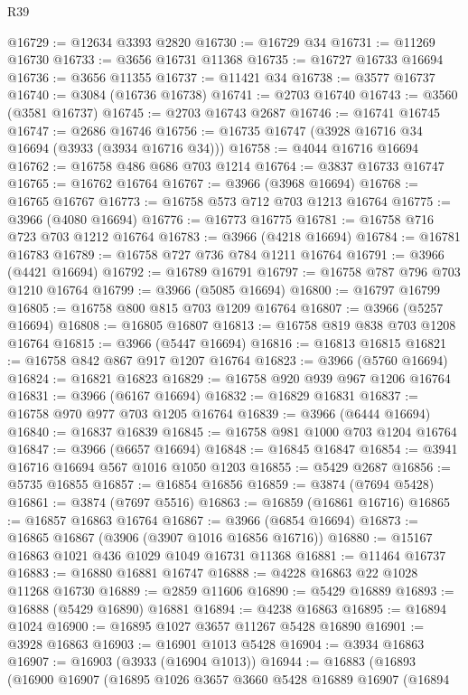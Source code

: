 \begin{lexlean}{R39}
\begin{coremodule}
@16729 := @12634 @3393 @2820
@16730 := @16729 @34
@16731 := @11269 @16730
@16733 := @3656 @16731 @11368
@16735 := @16727 @16733 @16694
@16736 := @3656 @11355
@16737 := @11421 @34
@16738 := @3577 @16737
@16740 := @3084 (@16736 @16738)
@16741 := @2703 @16740
@16743 := @3560 (@3581 @16737)
@16745 := @2703 @16743 @2687
@16746 := @16741 @16745
@16747 := @2686 @16746
@16756 := @16735 @16747 (@3928 @16716 @34 @16694 (@3933 (@3934 @16716 @34)))
@16758 := @4044 @16716 @16694
@16762 := @16758 @486 @686 @703 @1214
@16764 := @3837 @16733 @16747
@16765 := @16762 @16764
@16767 := @3966 (@3968 @16694)
@16768 := @16765 @16767
@16773 := @16758 @573 @712 @703 @1213 @16764
@16775 := @3966 (@4080 @16694)
@16776 := @16773 @16775
@16781 := @16758 @716 @723 @703 @1212 @16764
@16783 := @3966 (@4218 @16694)
@16784 := @16781 @16783
@16789 := @16758 @727 @736 @784 @1211 @16764
@16791 := @3966 (@4421 @16694)
@16792 := @16789 @16791
@16797 := @16758 @787 @796 @703 @1210 @16764
@16799 := @3966 (@5085 @16694)
@16800 := @16797 @16799
@16805 := @16758 @800 @815 @703 @1209 @16764
@16807 := @3966 (@5257 @16694)
@16808 := @16805 @16807
@16813 := @16758 @819 @838 @703 @1208 @16764
@16815 := @3966 (@5447 @16694)
@16816 := @16813 @16815
@16821 := @16758 @842 @867 @917 @1207 @16764
@16823 := @3966 (@5760 @16694)
@16824 := @16821 @16823
@16829 := @16758 @920 @939 @967 @1206 @16764
@16831 := @3966 (@6167 @16694)
@16832 := @16829 @16831
@16837 := @16758 @970 @977 @703 @1205 @16764
@16839 := @3966 (@6444 @16694)
@16840 := @16837 @16839
@16845 := @16758 @981 @1000 @703 @1204 @16764
@16847 := @3966 (@6657 @16694)
@16848 := @16845 @16847
@16854 := @3941 @16716 @16694 @567 @1016 @1050 @1203
@16855 := @5429 @2687
@16856 := @5735 @16855
@16857 := @16854 @16856
@16859 := @3874 (@7694 @5428)
@16861 := @3874 (@7697 @5516)
@16863 := @16859 (@16861 @16716)
@16865 := @16857 @16863 @16764
@16867 := @3966 (@6854 @16694)
@16873 := @16865 @16867 (@3906 (@3907 @1016 @16856 @16716))
@16880 := @15167 @16863 @1021 @436 @1029 @1049 @16731 @11368
@16881 := @11464 @16737
@16883 := @16880 @16881 @16747
@16888 := @4228 @16863 @22 @1028 @11268 @16730
@16889 := @2859 @11606
@16890 := @5429 @16889
@16893 := @16888 (@5429 @16890) @16881
@16894 := @4238 @16863
@16895 := @16894 @1024
@16900 := @16895 @1027 @3657 @11267 @5428 @16890
@16901 := @3928 @16863
@16903 := @16901 @1013 @5428
@16904 := @3934 @16863
@16907 := @16903 (@3933 (@16904 @1013))
@16944 := @16883
    (@16893
      (@16900
        @16907
        (@16895
          @1026
          @3657
          @3660
          @5428
          @16889
          @16907
          (@16894

\end{coremodule}
\end{lexlean}
